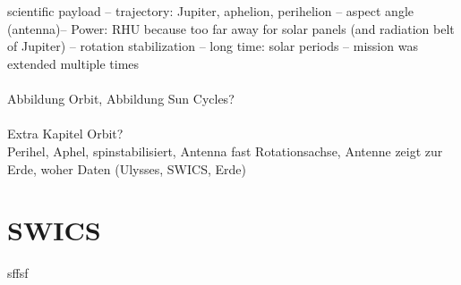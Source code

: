 \\ \\
scientific payload  -- trajectory: Jupiter, aphelion, perihelion -- aspect angle (antenna)-- Power: RHU because too far away for solar panels (and radiation belt of Jupiter) -- rotation stabilization -- long time: solar periods -- mission was extended multiple times
\\ \\
Abbildung Orbit, Abbildung Sun Cycles?
\\ \\ 
Extra Kapitel Orbit? \\
Perihel, Aphel, spinstabilisiert, Antenna fast Rotationsachse, Antenne zeigt zur Erde, woher Daten (Ulysses, SWICS, Erde)











\section{SWICS}
sffsf